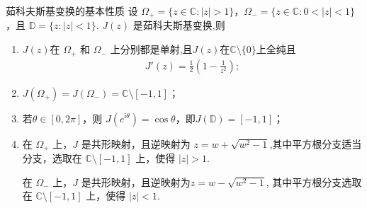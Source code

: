 \documentclass[../../main.tex]{subfiles}%
\begin{document}
\begin{theorem}茹科夫斯基变换的基本性质\label{theorem:茹科夫斯基变换的基本性质}
设 $\Omega_+=\{z\in\mathbb C: |z|>1\}$，$\Omega_-=\{z\in\mathbb C: 0<|z|<1\}$，且 $\mathbb D=\{z: |z|<1\}$. $J(z)$ 是茹科夫斯基变换,则
\begin{enumerate}[(1)]
\item\label{theorem:茹科夫斯基变换的基本性质-1} $J(z)$在 $\Omega_+$ 和 $\Omega_-$ 上分别都是单射,且$J(z)$在$\mathbb{C}\setminus \{0\}$上全纯且
\begin{align*}
J'(z)=\frac12(1-\frac1{z^2});
\end{align*}

\item\label{theorem:茹科夫斯基变换的基本性质-2} $J(\Omega_+)=J(\Omega_-)=\mathbb C\setminus[-1,1]$；

\item\label{theorem:茹科夫斯基变换的基本性质-3} 若$\theta\in [0,2\pi]$，则 $J(e^{\mathrm{i}\theta})=\cos\theta$，即$J(\mathbb{D})=[-1,1]$；

\item\label{theorem:茹科夫斯基变换的基本性质-4} 在 $\Omega_+$ 上，$J$ 是共形映射，且逆映射为 $z=w+\sqrt{w^2-1}$,其中平方根分支适当分支，选取在 $\mathbb C\setminus[-1,1]$ 上，使得 $|z|>1$.

在 $\Omega_-$ 上，$J$ 是共形映射，且逆映射为$z=w-\sqrt{w^2-1}$,
其中平方根分支选取在 $\mathbb C\setminus[-1,1]$ 上，使得 $|z|<1$.
\end{enumerate}
\end{theorem}
\end{document}
